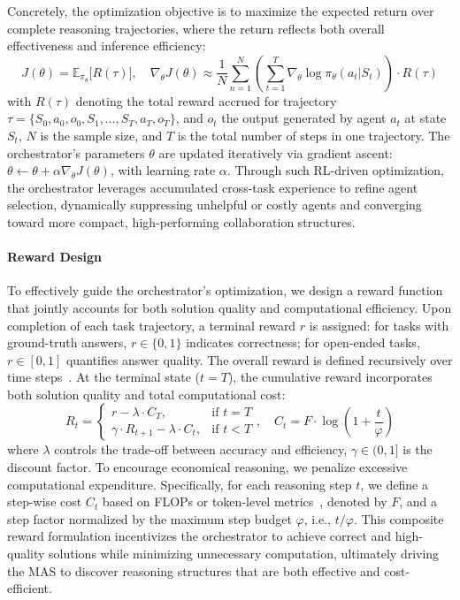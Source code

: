 \documentclass{article}
\begin{document}
Concretely, the optimization objective is to maximize the expected return over complete reasoning trajectories, where the return reflects both overall effectiveness and inference efficiency:
\begin{equation}
J(\theta) = \mathbb{E}_{\pi_\theta} \big[ R(\tau) \big], \quad \nabla_\theta J(\theta) \approx \frac{1}{N} \sum_{n=1}^N \left( \sum_{t=1}^T \nabla_\theta \log \pi_\theta(a_t | S_t)\right) \cdot R(\tau)
\end{equation}
with $R(\tau)$ denoting the total reward accrued for trajectory $\tau = \{S_0, a_0, o_0, S_1, \dots, S_T, a_T, o_T\}$, and $o_t$ the output generated by agent $a_t$ at state $S_t$, $N$ is the sample size, and $T$ is the total number of steps in one trajectory.
The orchestrator's parameters $\theta$ are updated iteratively via gradient ascent: $\theta \leftarrow \theta + \alpha \nabla_\theta J(\theta)$, with learning rate $\alpha$. 
Through such RL-driven optimization, the orchestrator leverages accumulated cross-task experience to refine agent selection, dynamically suppressing unhelpful or costly agents and converging toward more compact, high-performing collaboration structures. 


\paragraph{Reward Design}
To effectively guide the orchestrator’s optimization, we design a reward function that jointly accounts for both solution quality and computational efficiency. Upon completion of each task trajectory, a terminal reward $r$ is assigned: for tasks with ground-truth answers, $r \in \{0, 1\}$ indicates correctness; for open-ended tasks, $r \in [0, 1]$ quantifies answer quality.
The overall reward is defined recursively over time steps~\cite{sutton1999reinforcement}. At the terminal state ($t=T$), the cumulative reward incorporates both solution quality and total computational cost:
\begin{equation}
R_t =
\begin{cases}
    r - \lambda \cdot C_T, & \text{if } t = T \\
    \gamma \cdot R_{t+1} - \lambda \cdot C_t, & \text{if } t < T
\end{cases}, \quad C_t = F \cdot \log \left( 1 + \frac{t}{\varphi} \right)
\end{equation}
where $\lambda$ controls the trade-off between accuracy and efficiency, $\gamma \in (0, 1]$ is the discount factor. To encourage economical reasoning, we penalize excessive computational expenditure. Specifically, for each reasoning step $t$, we define a step-wise cost $C_t$ based on FLOPs or token-level metrics~\cite{sardana2024chinchillaoptimalaccountinginferencelanguage}, denoted by \(F\), and a step factor normalized by the maximum step budget $\varphi$, i.e., $t / \varphi$.
This composite reward formulation incentivizes the orchestrator to achieve correct and high-quality solutions while minimizing unnecessary computation, ultimately driving the MAS to discover reasoning structures that are both effective and cost-efficient.
\end{document}
